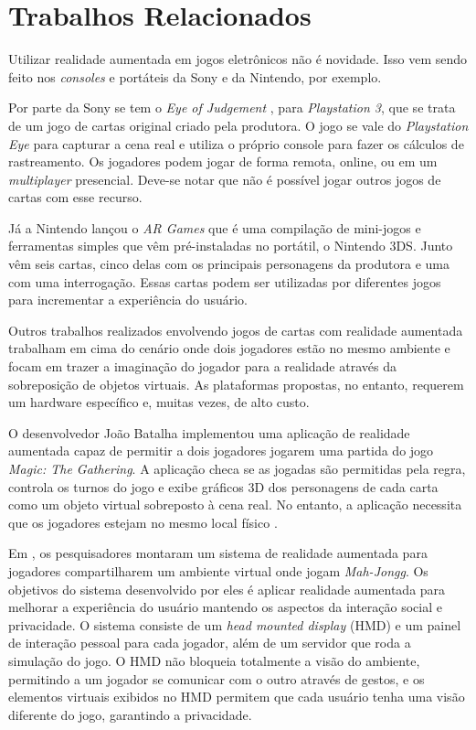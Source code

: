 \documentclass[conference]{IEEEtran}
\begin{document}
\section{Trabalhos Relacionados}
\label{rel}
Utilizar realidade aumentada em jogos eletrônicos não é novidade. Isso vem sendo 
feito nos \textit{consoles} e portáteis da Sony e da Nintendo, por exemplo.

Por parte da Sony se tem o \textit{Eye of Judgement} \cite{eyesony}, para 
\textit{Playstation 3}, que se trata de um jogo de cartas original criado pela 
produtora. O jogo se vale do \textit{Playstation Eye} para capturar a cena real 
e utiliza o próprio console para fazer os cálculos de rastreamento. Os jogadores 
podem jogar de forma remota, online, ou em um \textit{multiplayer} presencial. 
Deve-se notar que não é possível jogar outros jogos de cartas com esse recurso.

Já a Nintendo lançou o \textit{AR Games} \cite{3ds} que é uma compilação de 
mini-jogos e ferramentas simples que vêm pré-instaladas no portátil, o Nintendo 
3DS. Junto vêm seis cartas, cinco delas com os principais personagens da 
produtora e uma com uma interrogação. Essas cartas podem ser utilizadas por 
diferentes jogos para incrementar a experiência do usuário.

Outros trabalhos realizados envolvendo jogos de cartas com realidade aumentada 
trabalham em cima do cenário onde dois jogadores estão no mesmo ambiente e focam 
em trazer a imaginação do jogador para a realidade através da sobreposição de 
objetos virtuais. As plataformas propostas, no entanto, requerem um hardware 
específico e, muitas vezes, de alto custo.

O desenvolvedor João Batalha implementou uma aplicação de realidade aumentada 
capaz de permitir a dois jogadores jogarem uma partida do jogo \textit{Magic: 
The Gathering}. A aplicação checa se as jogadas são permitidas pela regra, 
controla os turnos do jogo e exibe gráficos 3D dos personagens de cada carta 
como um objeto virtual sobreposto à cena real. No entanto, a aplicação necessita 
que os jogadores estejam no mesmo local físico \cite{joao}.

Em \cite{Szalavari:1998:CGA:293701.293740}, os pesquisadores montaram um sistema 
de realidade aumentada para jogadores compartilharem um ambiente virtual onde 
jogam \textit{Mah-Jongg}. Os objetivos do sistema desenvolvido por eles é 
aplicar realidade aumentada para melhorar a experiência do usuário mantendo os 
aspectos da interação social e privacidade. O sistema consiste de um 
\textit{head mounted display} (HMD) e um painel de interação pessoal para cada 
jogador, além de um servidor que roda a simulação do jogo. O HMD não bloqueia 
totalmente a visão do ambiente, permitindo a um jogador se comunicar com o outro 
através de gestos, e os elementos virtuais exibidos no HMD permitem que cada 
usuário tenha uma visão diferente do jogo, garantindo a privacidade.
\end{document}
